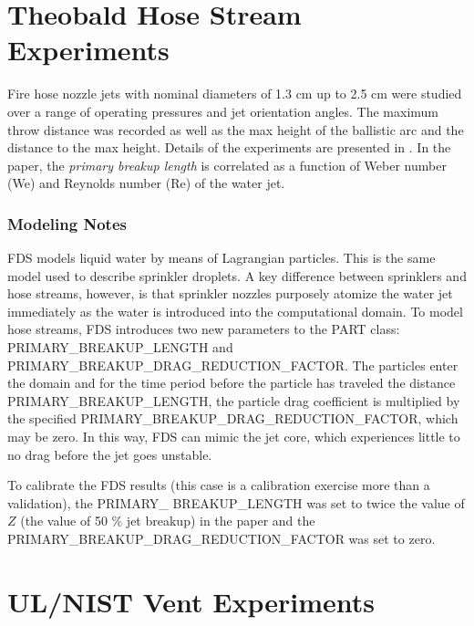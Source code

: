 \section{Theobald Hose Stream Experiments}
\label{Theobald_Description}

Fire hose nozzle jets with nominal diameters of 1.3 cm up to 2.5 cm were studied over a range of operating pressures and jet orientation angles.  The maximum throw distance was recorded as well as the max height of the ballistic arc and the distance to the max height.  Details of the experiments are presented in \cite{Theobald:1981}.  In the paper, the \emph{primary breakup length} is correlated as a function of Weber number (We) and Reynolds number (Re) of the water jet.

\subsubsection{Modeling Notes}

FDS models liquid water by means of Lagrangian particles.  This is the same model used to describe sprinkler droplets.  A key difference between sprinklers and hose streams, however, is that sprinkler nozzles purposely atomize the water jet immediately as the water is introduced into the computational domain.  To model hose streams, FDS introduces two new parameters to the {\ct PART} class: {\ct PRIMARY\_BREAKUP\_LENGTH} and {\ct PRIMARY\_BREAKUP\_DRAG\_REDUCTION\_FACTOR}.  The particles enter the domain and for the time period before the particle has traveled the distance {\ct PRIMARY\_BREAKUP\_LENGTH}, the particle drag coefficient is multiplied by the specified {\ct PRIMARY\_BREAKUP\_DRAG\_REDUCTION\_FACTOR}, which may be zero.  In this way, FDS can mimic the jet core, which experiences little to no drag before the jet goes unstable.

To calibrate the FDS results (this case is a calibration exercise more than a validation), the {\ct PRIMARY\_} {\ct BREAKUP\_LENGTH} was set to twice the value of $Z$ (the value of 50 \% jet breakup) in the paper and the {\ct PRIMARY\_BREAKUP\_DRAG\_REDUCTION\_FACTOR} was set to zero.


\section{UL/NIST Vent Experiments}
\label{UL_NIST_Vents_Description}

